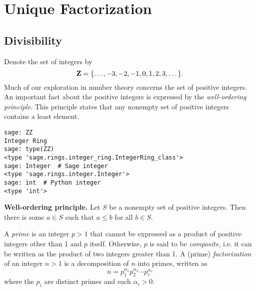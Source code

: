 
\chapter{Unique Factorization}



\section{Divisibility}

Denote the set of integers by\index{$\ZZ$}
\[
\mathbf{Z}
=
\{\dots, -3, -2, -1, 0, 1, 2, 3, \dots\}.
\]
Much of our exploration in number theory concerns the set of positive
integers. An important fact about the positive integers is expressed
by the
\emph{well-ordering principle}. This
principle states that any nonempty set of positive integers
contains a least element.

\begin{lstlisting}
sage: ZZ
Integer Ring
sage: type(ZZ)
<type 'sage.rings.integer_ring.IntegerRing_class'>
sage: Integer  # Sage integer
<type 'sage.rings.integer.Integer'>
sage: int  # Python integer
<type 'int'>
\end{lstlisting}

\begin{theorem}
\label{thm:unique_factorization:well_ordering_principle}
\textbf{Well-ordering principle.}
Let $S$ be a nonempty set of positive integers. Then there is some
$a \in S$ such that $a \leq b$ for all $b \in S$.
\end{theorem}

A \emph{prime} is an integer $p > 1$ that cannot be
expressed as a product of positive integers other than 1 and $p$
itself. Otherwise, $p$ is said to be
\emph{composite}, i.e. it can be written as the
product of two integers greater than 1. A (prime)
\emph{factorization} of an integer $n > 1$ is a
decomposition of $n$ into primes, written as
\[
n
=
p_1^{\alpha_1} p_2^{\alpha_2} \cdots p_r^{\alpha_r}
\]
where the $p_i$ are distinct primes and each $\alpha_i > 0$.

